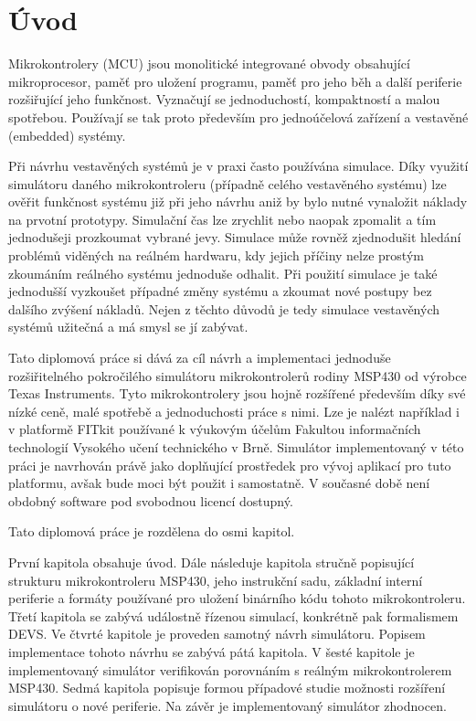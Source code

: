 \chapter{Úvod}

Mikrokontrolery (MCU) jsou monolitické integrované obvody obsahující mikroprocesor, paměť pro uložení programu, paměť pro jeho běh a další periferie
rozšiřující jeho funkčnost. Vyznačují se jednoduchostí, kompaktností a malou spotřebou. Používají se tak proto především pro jednoúčelová zařízení a 
vestavěné (embedded) systémy.

Při návrhu vestavěných systémů je v praxi často používána simulace. Díky využití simulátoru daného mikrokontroleru (případně celého vestavěného systému) lze ověřit funkčnost systému již při jeho návrhu aniž by bylo nutné vynaložit náklady na prvotní prototypy. Simulační čas lze zrychlit nebo naopak zpomalit a tím jednodušeji prozkoumat vybrané jevy. Simulace může rovněž zjednodušit hledání problémů viděných na reálném hardwaru, kdy jejich příčiny nelze prostým zkoumáním reálného systému jednoduše odhalit. Při použití simulace je také jednodušší vyzkoušet případné změny systému a zkoumat nové postupy bez dalšího zvýšení nákladů. Nejen z těchto důvodů je tedy simulace vestavěných systémů užitečná a má smysl se jí zabývat.

Tato diplomová práce si dává za cíl návrh a implementaci jednoduše rozšiřitelného pokročilého simulátoru mikrokontrolerů rodiny MSP430 od výrobce Texas Instruments. Tyto mikrokontrolery jsou hojně rozšířené především díky své nízké ceně, malé spotřebě a jednoduchosti práce s nimi. Lze je nalézt například i v platformě FITkit používané k výukovým účelům Fakultou informačních technologií Vysokého učení technického v Brně. Simulátor implementovaný v této práci je navrhován právě jako doplňující prostředek pro vývoj aplikací pro tuto platformu, avšak bude moci být použit i samostatně. V současné době není obdobný software pod svobodnou licencí dostupný.

Tato diplomová práce je rozdělena do osmi kapitol.

První kapitola obsahuje úvod. Dále následuje kapitola stručně popisující strukturu mikrokontroleru MSP430, jeho instrukční sadu, základní interní periferie a formáty používané pro uložení binárního kódu tohoto mikrokontroleru. Třetí kapitola se zabývá událostně řízenou simulací, konkrétně pak formalismem DEVS. Ve čtvrté kapitole je proveden samotný návrh simulátoru. Popisem implementace tohoto návrhu se zabývá pátá kapitola. V šesté kapitole je implementovaný simulátor verifikován porovnáním s reálným mikrokontrolerem MSP430. Sedmá kapitola popisuje formou případové studie možnosti rozšíření simulátoru o nové periferie. Na závěr je implementovaný simulátor zhodnocen.

